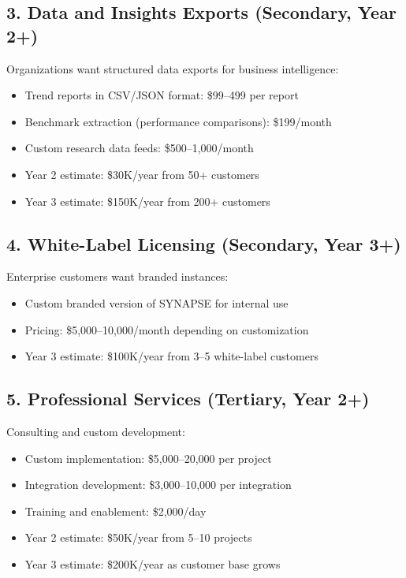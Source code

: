 \documentclass{report}
\begin{document}
\subsection{3. Data and Insights Exports (Secondary, Year 2+)}

Organizations want structured data exports for business intelligence:

\begin{itemize}
    \item Trend reports in CSV/JSON format: \$99--499 per report
    \item Benchmark extraction (performance comparisons): \$199/month
    \item Custom research data feeds: \$500--1,000/month
    \item Year 2 estimate: \$30K/year from 50+ customers
    \item Year 3 estimate: \$150K/year from 200+ customers
\end{itemize}

\subsection{4. White-Label Licensing (Secondary, Year 3+)}

Enterprise customers want branded instances:

\begin{itemize}
    \item Custom branded version of SYNAPSE for internal use
    \item Pricing: \$5,000--10,000/month depending on customization
    \item Year 3 estimate: \$100K/year from 3--5 white-label customers
\end{itemize}

\subsection{5. Professional Services (Tertiary, Year 2+)}

Consulting and custom development:

\begin{itemize}
    \item Custom implementation: \$5,000--20,000 per project
    \item Integration development: \$3,000--10,000 per integration
    \item Training and enablement: \$2,000/day
    \item Year 2 estimate: \$50K/year from 5--10 projects
    \item Year 3 estimate: \$200K/year as customer base grows
\end{itemize}
\end{document}
